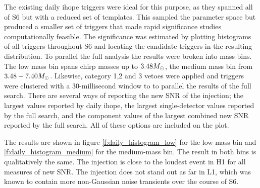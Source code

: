 The existing daily ihope triggers were ideal for this purpose, as they
spanned all of S6 but with a reduced set of templates.  This sampled
the parameter space but produced a smaller set of triggers that made
rapid significance studies computationally feasible.  The significance
was estimated by plotting histograms of all triggers throughout S6 and
locating the candidate triggers in the resulting distribution.  To
parallel the full analysis the results were broken into mass bins.
The low mass bin spans chirp masses up to $3.48M_\odot$, the medium mass
bin from $3.48-7.40 M_\odot$.  Likewise, category 1,2 and 3 vetoes were
applied and triggers were clustered with a 30-millisecond window to to
parallel the results of the full search.  There are several ways of
reporting the new SNR of the injection; the largest values reported by
daily ihope, the largest single-detector values reported by the full
search, and the component values of the largest combined new SNR
reported by the full search.  All of these options are included on the
plot.

The results are shown in figure \ref{f:daily_histogram_low} for the
low-mass bin and \ref{f:daily_histogram_medium} for the medium-mass
bin.  The result in both bins is qualitatively the same.  The
injection is close to the loudest event in H1 for all measures of new
SNR.  The injection does not stand out as far in L1, which was known
to contain more non-Gaussian noise transients over the course of S6.


